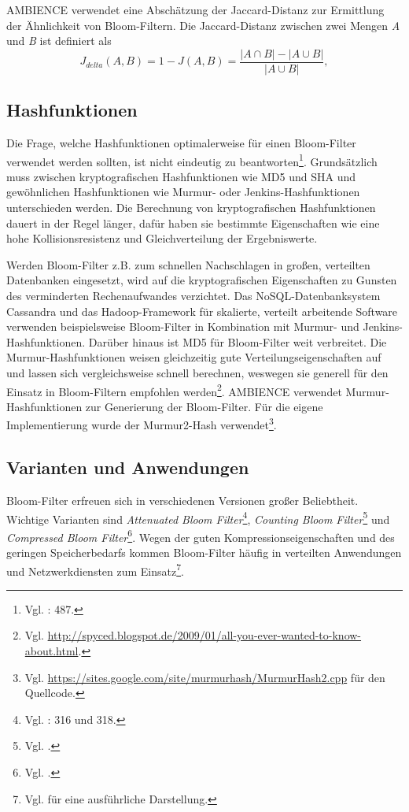 AMBIENCE verwendet eine Abschätzung der Jaccard-Distanz zur Ermittlung der Ähnlichkeit von Bloom-Filtern. Die Jaccard-Distanz zwischen zwei Mengen \textit{A} und \textit{B} ist definiert als 
\[J_{delta}(A,B) = 1 - J(A,B) = \frac{|A\cap B| - |A\cup B|}{|A\cup B|},\]
\subsection{Hashfunktionen}\label{sec:hashfunktionen}
Die Frage, welche Hashfunktionen optimalerweise für einen Bloom-Filter verwendet werden sollten, ist nicht eindeutig zu beantworten\footnote{Vgl. \cite{Broder2004}: 487.}. Grundsätzlich muss zwischen kryptografischen Hashfunktionen wie MD5 und SHA und gewöhnlichen Hashfunktionen wie Murmur- oder Jenkins-Hashfunktionen unterschieden werden. Die Berechnung von kryptografischen Hashfunktionen dauert in der Regel länger, dafür haben sie bestimmte Eigenschaften wie eine hohe Kollisionsresistenz und Gleichverteilung der Ergebniswerte. 

Werden Bloom-Filter z.B. zum schnellen Nachschlagen in großen, verteilten Datenbanken eingesetzt, wird auf die kryptografischen Eigenschaften zu Gunsten des verminderten Rechenaufwandes verzichtet. Das NoSQL-Datenbanksystem Cassandra und das Hadoop-Framework für skalierte, verteilt arbeitende Software verwenden beispielsweise Bloom-Filter in Kombination mit Murmur- und Jenkins-Hashfunktionen. Darüber hinaus ist MD5 für Bloom-Filter weit verbreitet. Die Murmur-Hashfunktionen weisen gleichzeitig gute Verteilungseigenschaften auf und lassen sich vergleichsweise schnell berechnen, weswegen sie generell für den Einsatz in Bloom-Filtern empfohlen werden\footnote{Vgl. \url{http://spyced.blogspot.de/2009/01/all-you-ever-wanted-to-know-about.html}.}. AMBIENCE verwendet Murmur-Hashfunktionen zur Generierung der Bloom-Filter. Für die eigene Implementierung wurde der Murmur2-Hash verwendet\footnote{Vgl. \url{https://sites.google.com/site/murmurhash/MurmurHash2.cpp} für den Quellcode.}.  
\subsection{Varianten und Anwendungen}\label{sec:bloom-anwendungen}
Bloom-Filter erfreuen sich in verschiedenen Versionen großer Beliebtheit. Wichtige Varianten sind \textit{Attenuated Bloom Filter}\footnote{Vgl. \cite{Sakuma2011}: 316 und 318.}, \textit{Counting Bloom Filter}\footnote{Vgl. \cite{Fan2000}.} und \textit{Compressed Bloom Filter}\footnote{Vgl. \cite{Mitzenmacher2002}.}. Wegen der guten Kompressionseigenschaften und des geringen Speicherbedarfs kommen Bloom-Filter häufig in verteilten Anwendungen und Netzwerkdiensten zum Einsatz\footnote{Vgl. \cite{Broder2004} für eine ausführliche Darstellung.}. 

